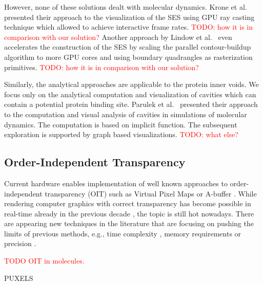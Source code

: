 However, none of these solutions dealt with molecular dynamics. 
Krone et al.~\cite{krone2009interactive} presented their approach to the visualization of the SES using GPU ray casting technique which allowed to achieve interactive frame rates. \textcolor{red}{TODO: how it is in comparison with our solution?} 
Another approach by Lindow et al.~\cite{lindow2010accelerated} even accelerates the construction of the SES by scaling the parallel contour-buildup algorithm to more GPU cores and using boundary quadrangles as rasterization primitives. \textcolor{red}{TODO: how it is in comparison with our solution?}

Similarly, the analytical approaches are applicable to the protein inner voids. 
We focus only on the analytical computation and visualization of cavities which can contain a potential protein binding site.
Parulek et al.~\cite{parulek2013visual} presented their approach to the computation and visual analysis of cavities in simulations of molecular dynamics.
The computation is based on implicit function. 
The subsequent exploration is supported by graph based visualizations.
\textcolor{red}{TODO: what else?}


\subsection{Order-Independent Transparency}
Current hardware enables implementation of well known approaches to order-independent transparency (OIT) such as Virtual Pixel Maps \cite{mammen1989transparency} or A-buffer \cite{carpenter1984abuffer}.
While rendering computer graphics with correct transparency has become possible in real-time already in the previous decade \cite{everitt2001interactive}, the topic is still hot nowadays.
There are appearing new techniques in the literature that are focusing on pushing the limits of previous methods, e.g., time complexity \cite{bavoil2008order}, memory requirements \cite{maule2012memory} \cite{vasilakis2015k+buffer} or precision \cite{enderton2011stochastic}.

\textcolor{red}{TODO OIT in molecules.}

\cite{yang2010real}
\cite{salvi2011adaptive}
PUXELS \cite{kauker2013rendering}


